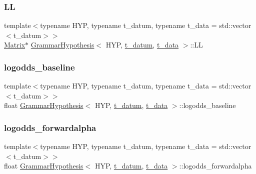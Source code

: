 \subsubsection{\texorpdfstring{LL}{LL}}
{\footnotesize\ttfamily template$<$typename H\+YP, typename t\+\_\+datum, typename t\+\_\+data = std\+::vector$<$t\+\_\+datum$>$$>$ \\
\hyperlink{_eigen_numerics_8h_a645222978e81acfb2523a9bce34aecc0}{Matrix}$\ast$ \hyperlink{class_grammar_hypothesis}{Grammar\+Hypothesis}$<$ H\+YP, \hyperlink{class_bayesable_a7c93a2eeab708378eb321745908718d4}{t\+\_\+datum}, \hyperlink{class_bayesable_a70a593a67c7d43239ecc06bb4fd06a6b}{t\+\_\+data} $>$\+::LL}

\mbox{\label{class_grammar_hypothesis_a41985a24a133b009328deed14a2b8802}} 
\subsubsection{\texorpdfstring{logodds\+\_\+baseline}{logodds\_baseline}}
{\footnotesize\ttfamily template$<$typename H\+YP, typename t\+\_\+datum, typename t\+\_\+data = std\+::vector$<$t\+\_\+datum$>$$>$ \\
float \hyperlink{class_grammar_hypothesis}{Grammar\+Hypothesis}$<$ H\+YP, \hyperlink{class_bayesable_a7c93a2eeab708378eb321745908718d4}{t\+\_\+datum}, \hyperlink{class_bayesable_a70a593a67c7d43239ecc06bb4fd06a6b}{t\+\_\+data} $>$\+::logodds\+\_\+baseline}

\mbox{\label{class_grammar_hypothesis_a1027d3f52f4d1adddd923a18fb393955}} 
\subsubsection{\texorpdfstring{logodds\+\_\+forwardalpha}{logodds\_forwardalpha}}
{\footnotesize\ttfamily template$<$typename H\+YP, typename t\+\_\+datum, typename t\+\_\+data = std\+::vector$<$t\+\_\+datum$>$$>$ \\
float \hyperlink{class_grammar_hypothesis}{Grammar\+Hypothesis}$<$ H\+YP, \hyperlink{class_bayesable_a7c93a2eeab708378eb321745908718d4}{t\+\_\+datum}, \hyperlink{class_bayesable_a70a593a67c7d43239ecc06bb4fd06a6b}{t\+\_\+data} $>$\+::logodds\+\_\+forwardalpha}

